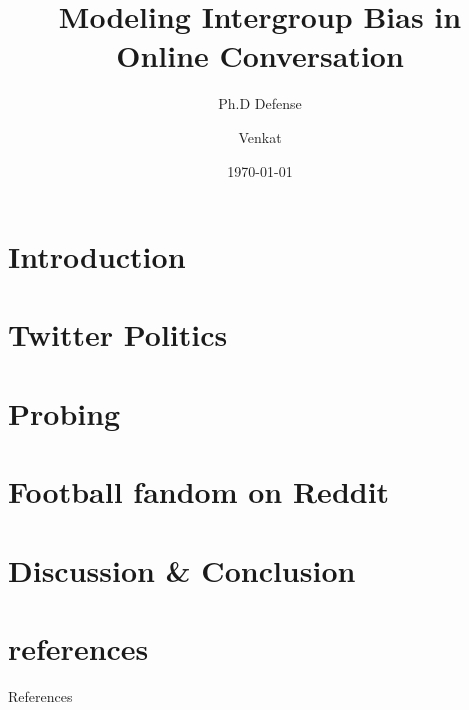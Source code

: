 \documentclass[11pt, light, aspectratio=1610, biblatex]{practical-presentation}
\title{Modeling Intergroup Bias in Online Conversation}
\subtitle{Ph.D Defense}
\date{\today}
\author{Venkat}
\institute{The University of Texas at Austin}
\begin{document}
\maketitle

{
\section{Introduction}

}

{
\section{Twitter Politics}

}

{
\section{Probing}

}

\section{Football fandom on Reddit}


{
\section{Discussion \& Conclusion}

}

{
\section*{references}
\begin{frame}{References}
\printbibliography[heading=none]
\end{frame}
}

\makeatletter
\renewcommand{\ExLBr}{\nfbc}
\renewcommand{\ExRBr}{\nfbc}
\makeatother

\appendix

\end{document}
